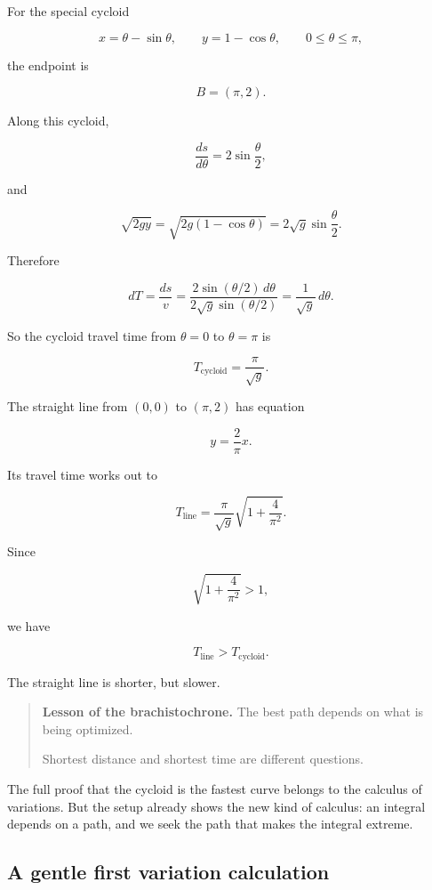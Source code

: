 For the special cycloid

\[
x=\theta-\sin\theta,
\qquad
y=1-\cos\theta,
\qquad
0\le \theta\le \pi,
\]

the endpoint is

\[
B=(\pi,2).
\]

Along this cycloid,

\[
\frac{ds}{d\theta}=2\sin\frac{\theta}{2},
\]

and

\[
\sqrt{2gy}
=
\sqrt{2g(1-\cos\theta)}
=
2\sqrt{g}\sin\frac{\theta}{2}.
\]

Therefore

\[
dT=\frac{ds}{v}
=
\frac{2\sin(\theta/2)\,d\theta}
{2\sqrt{g}\sin(\theta/2)}
=
\frac{1}{\sqrt g}\,d\theta.
\]

So the cycloid travel time from \(\theta=0\) to \(\theta=\pi\) is

\[
\boxed{
T_{\text{cycloid}}=\frac{\pi}{\sqrt g}.
}
\]

The straight line from \((0,0)\) to \((\pi,2)\) has equation

\[
y=\frac{2}{\pi}x.
\]

Its travel time works out to

\[
\boxed{
T_{\text{line}}
=
\frac{\pi}{\sqrt g}\sqrt{1+\frac{4}{\pi^2}}.
}
\]

Since

\[
\sqrt{1+\frac{4}{\pi^2}}>1,
\]

we have

\[
T_{\text{line}}>T_{\text{cycloid}}.
\]

The straight line is shorter, but slower.

\begin{quote}
\textbf{Lesson of the brachistochrone.}
The best path depends on what is being optimized.

Shortest distance and shortest time are different questions.
\end{quote}

The full proof that the cycloid is the fastest curve belongs to the calculus of variations.
But the setup already shows the new kind of calculus: an integral depends on a path, and
we seek the path that makes the integral extreme.

\subsection{A gentle first variation calculation}
\label{subsec:gentle-first-variation-calculation}

